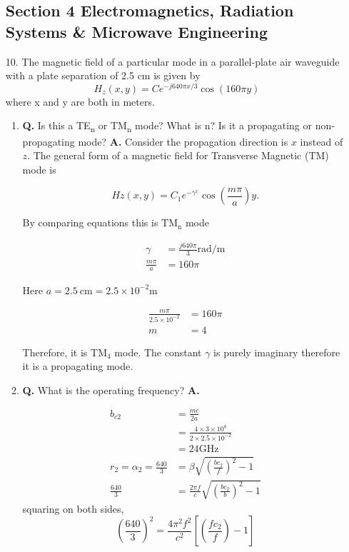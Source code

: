 \documentclass[main.tex]{subfiles}
\begin{document}
\begin{enumerate}

\subsection*{Section 4 Electromagnetics, Radiation Systems \& Microwave Engineering}

\item [10.] The magnetic field of a particular mode in a parallel-plate air waveguide with a plate separation of 2.5 cm is given by
$$H_{z}(x, y)=C e^{-j 640 \pi x / 3} \cos (160 \pi y)$$
where x and y are both in meters.
    
    \begin{enumerate}
        \item \textbf{Q.} Is this a TE\textsubscript{n} or TM\textsubscript{n} mode? What is n? Is it a propagating or non-propagating mode? \textbf{A.} Consider the propagation direction is $x$ instead of $z$. The general form of a magnetic field for Transverse Magnetic (TM) mode is
        
        $$
        H z(x, y)=C_1 e^{-\gamma^x} \cos \left(\frac{m \pi}{a}\right) y.
        $$
        
        By comparing equations this is $\mathrm{TM_n}$ mode

        $$
        \begin{aligned}
        \gamma &= \frac{j 640 \pi}{3} \mathrm{rad}/\mathrm{m}\\
        \frac{m \pi}{a} &= 160 \pi
        \end{aligned}
        $$
        
        Here $a=2.5 \mathrm{~cm}=2.5 \times 10^{-2} \mathrm{m}$

        $$
        \begin{aligned}
        \frac{m \pi}{2.5 \times 10^{-2}} &= 160 \pi \\
        m &= 4
        \end{aligned}
        $$

        Therefore, it is $\mathrm{TM_4}$ mode. The constant $\gamma$ is purely imaginary therefore it is a propagating mode.
        
        \item \textbf{Q.} What is the operating frequency? \textbf{A.}

        $$
        \begin{aligned}
        b_{c2} &= \frac{m c}{2 a} \\
        &= \frac{4 \times 3 \times 10^8}{2 \times 2.5 \times 10^{-2}} \\
        &= 24 \mathrm{GHz} \\
        r_2 = \alpha_2 = \frac{640}{3} &= \beta \sqrt{\left(\frac{b c_2}{f}\right)^2-1} \\
        \frac{640}{3} &= \frac{2 \pi f}{c} \sqrt{\left(\frac{b c_2}{b}\right)^2-1}
        \end{aligned}
        $$
        squaring on both sides,
        $$
        \left(\frac{640}{3}\right)^2=\frac{4 \pi^2 f^2}{c^2}\left[\left(\frac{f c_2}{f}\right)-1\right]
        $$
        

\end{enumerate}
\end{enumerate}
\end{document}
